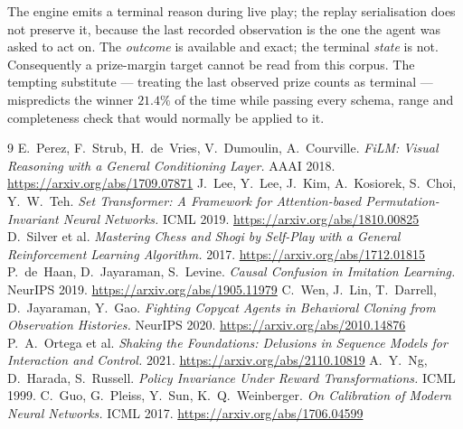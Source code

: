 \documentclass[11pt,a4paper]{article}
\begin{document}
\noindent
The engine emits a terminal reason during live play; the replay serialisation
does not preserve it, because the last recorded observation is the one the agent
was asked to act on. The \emph{outcome} is available and exact; the terminal
\emph{state} is not. Consequently a prize-margin target cannot be read from this
corpus. The tempting substitute --- treating the last observed prize counts as
terminal --- mispredicts the winner $21.4\%$ of the time while passing every
schema, range and completeness check that would normally be applied to it.

\begin{thebibliography}{9}
 E.~Perez, F.~Strub, H.~de~Vries, V.~Dumoulin, A.~Courville.
  \emph{FiLM: Visual Reasoning with a General Conditioning Layer.} AAAI 2018.
  \url{https://arxiv.org/abs/1709.07871}
 J.~Lee, Y.~Lee, J.~Kim, A.~Kosiorek, S.~Choi, Y.~W.~Teh.
  \emph{Set Transformer: A Framework for Attention-based Permutation-Invariant
  Neural Networks.} ICML 2019. \url{https://arxiv.org/abs/1810.00825}
 D.~Silver et al.
  \emph{Mastering Chess and Shogi by Self-Play with a General Reinforcement
  Learning Algorithm.} 2017. \url{https://arxiv.org/abs/1712.01815}
 P.~de~Haan, D.~Jayaraman, S.~Levine.
  \emph{Causal Confusion in Imitation Learning.} NeurIPS 2019.
  \url{https://arxiv.org/abs/1905.11979}
 C.~Wen, J.~Lin, T.~Darrell, D.~Jayaraman, Y.~Gao.
  \emph{Fighting Copycat Agents in Behavioral Cloning from Observation
  Histories.} NeurIPS 2020. \url{https://arxiv.org/abs/2010.14876}
 P.~A.~Ortega et al.
  \emph{Shaking the Foundations: Delusions in Sequence Models for Interaction
  and Control.} 2021. \url{https://arxiv.org/abs/2110.10819}
 A.~Y.~Ng, D.~Harada, S.~Russell.
  \emph{Policy Invariance Under Reward Transformations.} ICML 1999.
 C.~Guo, G.~Pleiss, Y.~Sun, K.~Q.~Weinberger.
  \emph{On Calibration of Modern Neural Networks.} ICML 2017.
  \url{https://arxiv.org/abs/1706.04599}
\end{thebibliography}
\end{document}
